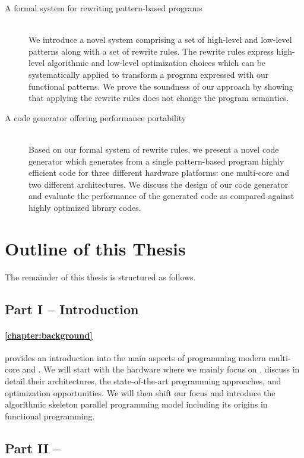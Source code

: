\begin{description}
  \item[A formal system for rewriting pattern-based programs]\hfill\\[-1em]
    We introduce a novel system comprising a set of high-level and low-level patterns along with a set of rewrite rules.
    The rewrite rules express high-level algorithmic and low-level optimization choices which can be systematically applied to transform a program expressed with our functional patterns.
    We prove the soundness of our approach by showing that applying the rewrite rules does not change the program semantics.

  \item[A code generator offering performance portability]\hfill\\[.25em]
    Based on our formal system of rewrite rules, we present a novel code generator which generates from a single pattern-based program highly efficient \OpenCL code for three different hardware platforms:
    one multi-core \CPU and two different \GPU architectures.
    We discuss the design of our code generator and evaluate the performance of the generated \OpenCL code as compared against highly optimized library codes.
\end{description}

\section{Outline of this Thesis}
The remainder of this thesis is structured as follows.

\subsection*{Part I -- Introduction}

\paragraph{\autoref{chapter:background}} provides an introduction into the main aspects of programming modern multi-core \CPUs and \GPUs.
We will start with the hardware where we mainly focus on \GPUs, discuss in detail their architectures, the state-of-the-art programming approaches, and optimization opportunities.
We will then shift our focus and introduce the algorithmic skeleton parallel programming model including its origins in functional programming.


\subsection*{Part II -- \SkelCL}

